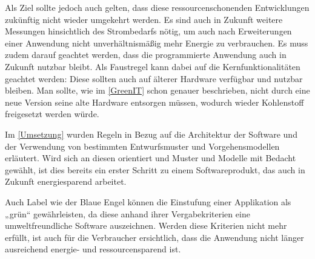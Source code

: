 \documentclass[utf8,biblatex]{lni}
\begin{document}
Als Ziel sollte jedoch auch gelten, dass diese ressourcenschonenden Entwicklungen zukünftig nicht wieder umgekehrt werden. Es sind auch in Zukunft weitere Messungen hinsichtlich des Strombedarfs nötig, um auch nach Erweiterungen einer Anwendung nicht unverhältnismäßig mehr Energie zu verbrauchen. Es muss zudem darauf geachtet werden, dass die programmierte Anwendung auch in Zukunft nutzbar bleibt. Als Faustregel kann dabei auf die Kernfunktionalitäten geachtet werden: Diese sollten auch auf älterer Hardware verfügbar und nutzbar bleiben. \cite{Verdecchia21} Man sollte, wie im \autoref{GreenIT}  schon genauer beschrieben, nicht durch eine neue Version seine alte Hardware entsorgen müssen, wodurch wieder Kohlenstoff freigesetzt werden würde.

Im \autoref{Umsetzung}  wurden Regeln in Bezug auf die Architektur der Software und der Verwendung von bestimmten Entwurfsmuster und Vorgehensmodellen erläutert. Wird sich an diesen orientiert und Muster und Modelle mit Bedacht gewählt, ist dies bereits ein erster Schritt zu einem Softwareprodukt, das auch in Zukunft energiesparend arbeitet.

Auch Label wie der Blaue Engel können die Einstufung einer Applikation als „grün“ gewährleisten, da diese anhand ihrer Vergabekriterien eine umweltfreundliche Software auszeichnen. Werden diese Kriterien nicht mehr erfüllt, ist auch für die Verbraucher ersichtlich, dass die Anwendung nicht länger ausreichend energie- und ressourcensparend ist. \cite{BlauerEngel20}
\end{document}
